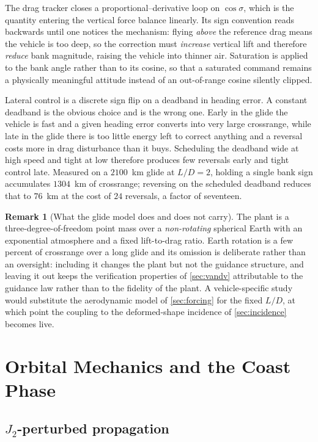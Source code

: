 \documentclass[11pt,a4paper]{article}
\theoremstyle{definition}
\newtheorem{remark}[theorem]{Remark}
\numberwithin{equation}{section}
\begin{document}
The drag tracker closes a proportional--derivative loop on $\cos\sigma$, which is the quantity entering the vertical force balance linearly. Its sign convention reads backwards until one notices the mechanism: flying \emph{above} the reference drag means the vehicle is too deep, so the correction must \emph{increase} vertical lift and therefore \emph{reduce} bank magnitude, raising the vehicle into thinner air. Saturation is applied to the bank angle rather than to its cosine, so that a saturated command remains a physically meaningful attitude instead of an out-of-range cosine silently clipped.

Lateral control is a discrete sign flip on a deadband in heading error. A constant deadband is the obvious choice and is the wrong one. Early in the glide the vehicle is fast and a given heading error converts into very large crossrange, while late in the glide there is too little energy left to correct anything and a reversal costs more in drag disturbance than it buys. Scheduling the deadband wide at high speed and tight at low therefore produces few reversals early and tight control late. Measured on a $2100$~km glide at $L/D = 2$, holding a single bank sign accumulates $1304$~km of crossrange; reversing on the scheduled deadband reduces that to $76$~km at the cost of $24$ reversals, a factor of seventeen.

\begin{remark}[What the glide model does and does not carry]
The plant is a three-degree-of-freedom point mass over a \emph{non-rotating} spherical Earth with an exponential atmosphere and a fixed lift-to-drag ratio. Earth rotation is a few percent of crossrange over a long glide and its omission is deliberate rather than an oversight: including it changes the plant but not the guidance structure, and leaving it out keeps the verification properties of \cref{sec:vandv} attributable to the guidance law rather than to the fidelity of the plant. A vehicle-specific study would substitute the aerodynamic model of \cref{sec:forcing} for the fixed $L/D$, at which point the coupling to the deformed-shape incidence of \cref{sec:incidence} becomes live.
\end{remark}

\section{Orbital Mechanics and the Coast Phase}
\label{sec:orbital}

\subsection{\texorpdfstring{$J_2$}{J2}-perturbed propagation}
\label{sec:j2}
\end{document}
